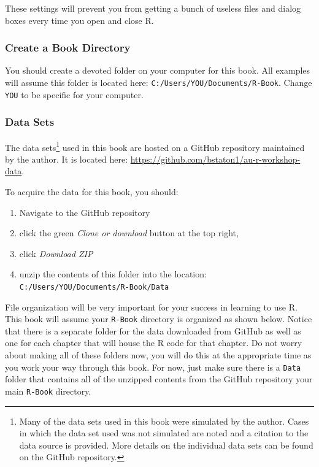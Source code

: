 \documentclass[]{book}
\providecommand{\tightlist}{%
  \setlength{\itemsep}{0pt}\setlength{\parskip}{0pt}}
\let\rmarkdownfootnote\footnote%
\def\footnote{\protect\rmarkdownfootnote}
\begin{document}
These settings will prevent you from getting a bunch of useless files and dialog boxes every time you open and close R.

\hypertarget{create-a-book-directory}{%
\subsubsection*{Create a Book Directory}\label{create-a-book-directory}}

You should create a devoted folder on your computer for this book. All examples will assume this folder is located here: \texttt{C:/Users/YOU/Documents/R-Book}. Change \texttt{YOU} to be specific for your computer.

\hypertarget{data-sets}{%
\subsubsection*{Data Sets}\label{data-sets}}

The data sets\footnote{Many of the data sets used in this book were simulated by the author. Cases in which the data set used was not simulated are noted and a citation to the data source is provided. More details on the individual data sets can be found on the GitHub repository.}
used in this book are hosted on a GitHub repository maintained by the author. It is located here: \url{https://github.com/bstaton1/au-r-workshop-data}.

To acquire the data for this book, you should:

\begin{enumerate}
\def\labelenumi{\arabic{enumi}.}
\tightlist
\item
  Navigate to the GitHub repository
\item
  click the green \emph{Clone or download} button at the top right,
\item
  click \emph{Download ZIP}
\item
  unzip the contents of this folder into the location: \texttt{C:/Users/YOU/Documents/R-Book/Data}
\end{enumerate}

File organization will be very important for your success in learning to use R. This book will assume your \texttt{R-Book} directory is organized as shown below. Notice that there is a separate folder for the data downloaded from GitHub as well as one for each chapter that will house the R code for that chapter. Do not worry about making all of these folders now, you will do this at the appropriate time as you work your way through this book. For now, just make sure there is a \texttt{Data} folder that contains all of the unzipped contents from the GitHub repository your main \texttt{R-Book} directory.
\end{document}
